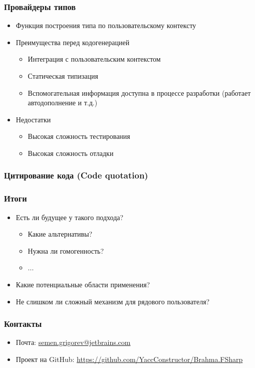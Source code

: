 \documentclass[xcolor=table]{beamer}
\begin{document}
\begin{frame}[fragile]
  \transwipe[direction=90]
  \frametitle{Провайдеры типов}
  \begin {itemize}
  \item Функция построения типа по пользовательскому контексту
  \item Преимущества перед кодогенерацией
  \begin {itemize}
   \item Интеграция с пользовательским контекстом
   \item Статическая типизация
   \item Вспомогательная информация доступна в процессе разработки (работает автодополнение и т.д.)
  \end {itemize}

  \item Недостатки
  \begin {itemize}
    \item Высокая сложность тестирования
    \item Высокая сложность отладки
  \end {itemize}
\end {itemize}
\end{frame}

\begin{frame}[fragile]
  \transwipe[direction=90]
  \frametitle{Цитирование кода (Code quotation)}
\end{frame}




\begin{frame}
  \transwipe[direction=90]
  \frametitle{Итоги}

\begin{itemize} 
\item Есть ли будущее у такого подхода?
\begin{itemize} 
  \item Какие альтернативы?
  \item Нужна ли гомогенность?
  \item ...
\end{itemize}
\item Какие потенциальные области применения?
\item Не слишком ли сложный механизм для рядового пользователя?
\end{itemize}

\end{frame}

            
\begin{frame}
\transwipe[direction=90]
\frametitle{Контакты}
\begin{itemize}
  \item Почта: \url{semen.grigorev@jetbrains.com}
  \item Проект на GitHub: \url{https://github.com/YaccConstructor/Brahma.FSharp}
\end{itemize}
\end{frame}
\end{document}

